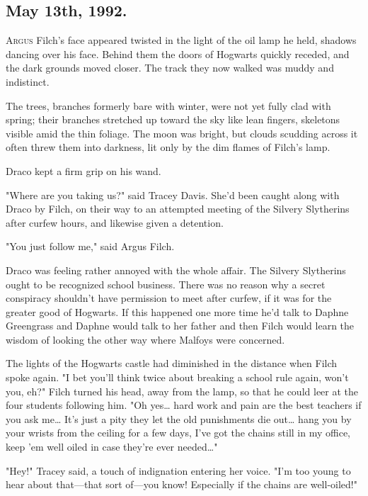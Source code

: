 
\subsection{May 13th, 1992.}

\lettrine{A}{rgus} Filch's face appeared twisted in the light of the oil lamp he held, 
shadows dancing over his face. Behind them the doors of Hogwarts quickly 
receded, and the dark grounds moved closer. The track they now walked was muddy 
and indistinct.

The trees, branches formerly bare with winter, were not yet fully clad with 
spring; their branches stretched up toward the sky like lean fingers, skeletons 
visible amid the thin foliage. The moon was bright, but clouds scudding across 
it often threw them into darkness, lit only by the dim flames of Filch's lamp.

Draco kept a firm grip on his wand.

"Where are you taking us?" said Tracey Davis. She'd been caught along with 
Draco by Filch, on their way to an attempted meeting of the Silvery Slytherins 
after curfew hours, and likewise given a detention.

"You just follow me," said Argus Filch.

Draco was feeling rather annoyed with the whole affair. The Silvery Slytherins 
ought to be recognized school business. There was no reason why a secret 
conspiracy shouldn't have permission to meet after curfew, if it was for the 
greater good of Hogwarts. If this happened one more time he'd talk to Daphne 
Greengrass and Daphne would talk to her father and then Filch would learn the 
wisdom of looking the other way where Malfoys were concerned.

The lights of the Hogwarts castle had diminished in the distance when Filch 
spoke again. "I bet you'll think twice about breaking a school rule again, 
won't you, eh?" Filch turned his head, away from the lamp, so that he could 
leer at the four students following him. "Oh yes{\ldots} hard work and pain are 
the best teachers if you ask me{\ldots} It's just a pity they let the old 
punishments die out{\ldots} hang you by your wrists from the ceiling for a few 
days, I've got the chains still in my office, keep 'em well oiled in case 
they're ever needed{\ldots}"

"Hey!" Tracey said, a touch of indignation entering her voice. "I'm too young 
to hear about that---that sort of---you know! Especially if the chains are 
well-oiled!"

